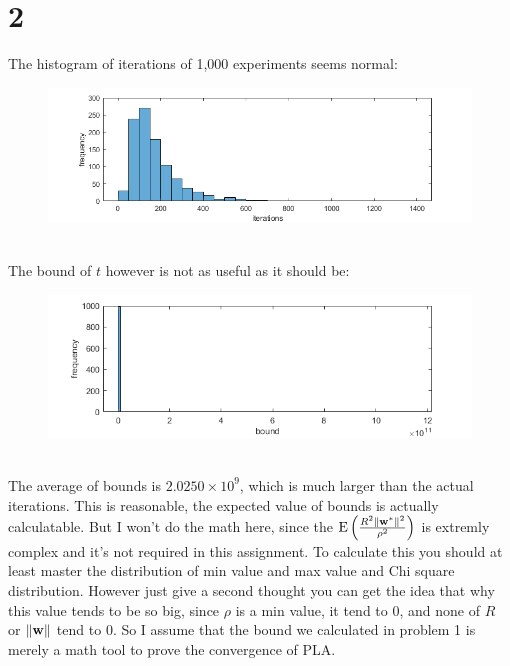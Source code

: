 \documentclass{article}
\begin{document}
\section{2 }
The histogram of iterations of 1,000 experiments seems normal:
\begin{figure}[H]
	\centering
	\includegraphics[width=\textwidth]{lab.png}
\end{figure}
\ \\
The bound of $t$ however is not as useful as it should be:
\begin{figure}[H]
	\centering
	\includegraphics[width=\textwidth]{bound.png}
\end{figure}
\ \\
The average of bounds is $2.0250 \times 10^9$, which is much larger than the actual iterations. This is reasonable, the expected value of bounds is actually calculatable. But I won't do the math here, since the $\text{E}\left(\frac{R^2\left\|{\mathbf w}^*\right\|^2}{\rho^2}\right)$ is extremly complex and it's not required in this assignment. To calculate this you should at least master the distribution of min value and max value and Chi square distribution. However just give a second thought you can get the idea that why this value tends to be so big, since $\rho$ is a min value, it tend to $0$, and none of $R$ or $\left\|{\mathbf w}\right\|$ tend to $0$. So I assume that the bound we calculated in problem 1 is merely a math tool to prove the convergence of PLA.
\end{document}
